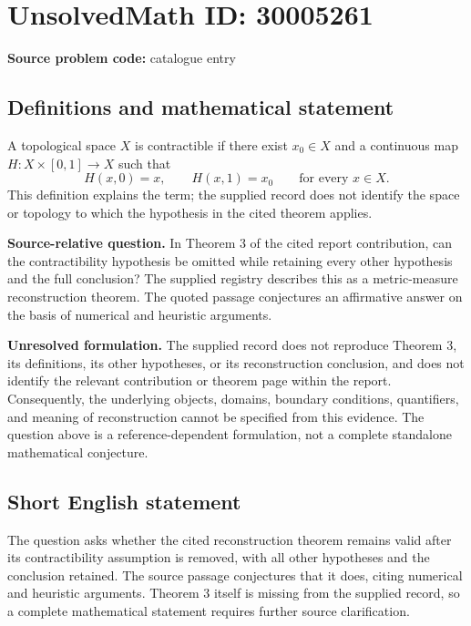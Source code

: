 \documentclass[11pt]{article}
\begin{document}
\section*{UnsolvedMath ID: 30005261}
\textbf{Source problem code:} catalogue entry
\subsection{Definitions and mathematical statement}
A topological space \(X\) is contractible if there exist \(x_0\in X\) and a continuous map \(H:X\times[0,1]\to X\) such that
\[
H(x,0)=x,\qquad H(x,1)=x_0\qquad\text{for every }x\in X.
\]
This definition explains the term; the supplied record does not identify the space or topology to which the hypothesis in the cited theorem applies.

\textbf{Source-relative question.} In Theorem 3 of the cited report contribution, can the contractibility hypothesis be omitted while retaining every other hypothesis and the full conclusion? The supplied registry describes this as a metric-measure reconstruction theorem. The quoted passage conjectures an affirmative answer on the basis of numerical and heuristic arguments.

\textbf{Unresolved formulation.} The supplied record does not reproduce Theorem 3, its definitions, its other hypotheses, or its reconstruction conclusion, and does not identify the relevant contribution or theorem page within the report. Consequently, the underlying objects, domains, boundary conditions, quantifiers, and meaning of reconstruction cannot be specified from this evidence. The question above is a reference-dependent formulation, not a complete standalone mathematical conjecture.
\subsection{Short English statement}
The question asks whether the cited reconstruction theorem remains valid after its contractibility assumption is removed, with all other hypotheses and the conclusion retained. The source passage conjectures that it does, citing numerical and heuristic arguments. Theorem 3 itself is missing from the supplied record, so a complete mathematical statement requires further source clarification.
\end{document}
